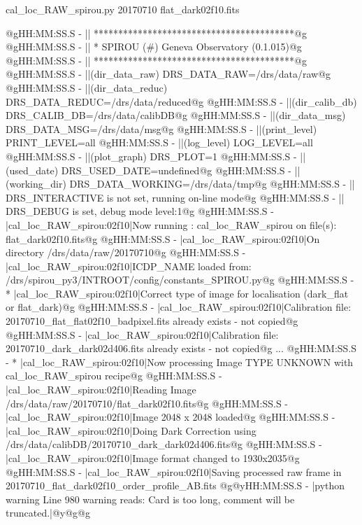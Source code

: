 \begin{cmdbox}[title={example}]
cal_loc_RAW_spirou.py 20170710 flat_dark02f10.fits
\end{cmdbox}
\begin{cmdboxprintspecial}[fontupper=\tiny, fontlower=\tiny]
@gHH:MM:SS.S -   || *****************************************@g
@gHH:MM:SS.S -   || * SPIROU \@(#) Geneva Observatory (0.1.015)@g
@gHH:MM:SS.S -   || *****************************************@g
@gHH:MM:SS.S -   ||(dir_data_raw)      DRS_DATA_RAW=/drs/data/raw@g
@gHH:MM:SS.S -   ||(dir_data_reduc)    DRS_DATA_REDUC=/drs/data/reduced@g
@gHH:MM:SS.S -   ||(dir_calib_db)      DRS_CALIB_DB=/drs/data/calibDB@g
@gHH:MM:SS.S -   ||(dir_data_msg)      DRS_DATA_MSG=/drs/data/msg@g
@gHH:MM:SS.S -   ||(print_level)       PRINT_LEVEL=all         %
@gHH:MM:SS.S -   ||(log_level)         LOG_LEVEL=all         %
@gHH:MM:SS.S -   ||(plot_graph)        DRS_PLOT=1            %
@gHH:MM:SS.S -   ||(used_date)         DRS_USED_DATE=undefined@g
@gHH:MM:SS.S -   ||(working_dir)       DRS_DATA_WORKING=/drs/data/tmp@g
@gHH:MM:SS.S -   ||                    DRS_INTERACTIVE is not set, running on-line mode@g
@gHH:MM:SS.S -   ||                    DRS_DEBUG is set, debug mode level:1@g
@gHH:MM:SS.S -   |cal_loc_RAW_spirou:02f10|Now running : cal_loc_RAW_spirou on file(s): flat_dark02f10.fits@g
@gHH:MM:SS.S -   |cal_loc_RAW_spirou:02f10|On directory /drs/data/raw/20170710@g
@gHH:MM:SS.S -   |cal_loc_RAW_spirou:02f10|ICDP_NAME loaded from: /drs/spirou_py3/INTROOT/config/constants_SPIROU.py@g
@gHH:MM:SS.S - * |cal_loc_RAW_spirou:02f10|Correct type of image for localisation (dark_flat or flat_dark)@g
@gHH:MM:SS.S -   |cal_loc_RAW_spirou:02f10|Calibration file: 20170710_flat_flat02f10_badpixel.fits already exists - not copied@g
@gHH:MM:SS.S -   |cal_loc_RAW_spirou:02f10|Calibration file: 20170710_dark_dark02d406.fits already exists - not copied@g
...
@gHH:MM:SS.S - * |cal_loc_RAW_spirou:02f10|Now processing Image TYPE UNKNOWN with cal_loc_RAW_spirou recipe@g
@gHH:MM:SS.S -   |cal_loc_RAW_spirou:02f10|Reading Image /drs/data/raw/20170710/flat_dark02f10.fits@g
@gHH:MM:SS.S -   |cal_loc_RAW_spirou:02f10|Image 2048 x 2048 loaded@g
@gHH:MM:SS.S -   |cal_loc_RAW_spirou:02f10|Doing Dark Correction using /drs/data/calibDB/20170710_dark_dark02d406.fits@g
@gHH:MM:SS.S -   |cal_loc_RAW_spirou:02f10|Image format changed to 1930x2035@g
@gHH:MM:SS.S -   |cal_loc_RAW_spirou:02f10|Saving processed raw frame in 20170710_flat_dark02f10_order_profile_AB.fits
@g@yHH:MM:SS.S - \@ |python warning Line 980  warning reads: Card is too long, comment will be truncated.|@y@g@g

\end{cmdboxprintspecial}
